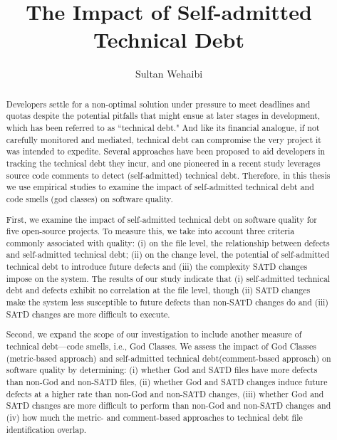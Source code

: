 \documentclass[12pt]{report}
\author{Sultan Wehaibi}
\title {The Impact of Self-admitted Technical Debt}
\newcommand{\SATD}{self-admitted technical debt\xspace}
\begin{document}
\begin{abstract}
	
	

Developers settle for a non-optimal solution under pressure to meet deadlines and quotas despite the potential pitfalls that might ensue at later stages in development, which has been referred to as ``technical debt." And like its financial analogue, if not carefully monitored and mediated, technical debt can compromise the very project it was intended to expedite. Several approaches have been proposed to aid developers in tracking the technical debt they incur, and one pioneered in a recent study leverages source code comments to detect (self-admitted) technical debt. Therefore, in this thesis we use empirical studies to examine the impact of self-admitted technical debt and code smells (god classes) on software quality.

First, we examine the impact of \SATD on software quality for five open-source projects. To measure this, we take into account three criteria commonly associated with quality: (i) on the file level, the relationship between defects and \SATD; (ii) on the change level, the potential of \SATD to introduce future defects and (iii) the complexity SATD changes impose on the system. The results of our study indicate that (i) \SATD and defects exhibit no correlation at the file level, though (ii) SATD changes make the system less susceptible to future defects than non-SATD changes do and (iii) SATD changes are more difficult to execute.

Second, we expand the scope of our investigation to include another measure of technical debt---code smells, i.e., God Classes. We assess the impact of God Classes (metric-based approach) and \SATD (comment-based approach) on software quality by determining: (i) whether God and SATD files have more defects than non-God and non-SATD files, (ii) whether God and SATD changes induce future defects at a higher rate than non-God and non-SATD changes, (iii) whether God and SATD changes are more difficult to perform than non-God and non-SATD changes and (iv) how much the metric- and comment-based approaches to technical debt file identification overlap.


\end{abstract}
\end{document}
